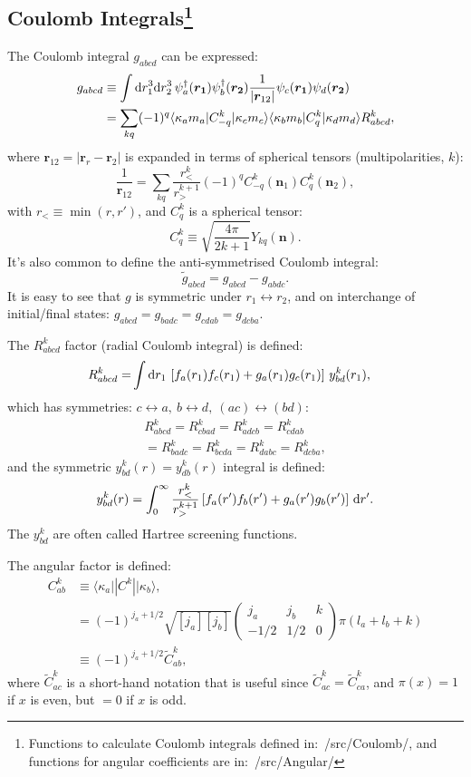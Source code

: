 \documentclass[10pt,twocolumn,a4paper]{article}%
\newcommand{\bra}[1]{\ensuremath{\langle #1|}}	%
\newcommand{\ket}[1]{\ensuremath{|#1\rangle}}	%
\newcommand{\threej}[6]{\ensuremath{\begin{pmatrix}#1&#2&#3\\#4&#5&#6\end{pmatrix}}}	%
\renewcommand{\v}[1]{\ensuremath{\boldsymbol{#1}}}		%
\newcommand{\be}{\begin{equation}}
\newcommand{\ee}{\end{equation}}
\def\d{\ensuremath{{\rm d}}}
\newcommand{\psidag}{\ensuremath{\psi^\dagger}}	%
\renewcommand{\k}{\ensuremath{\kappa}}
\begin{document}
\subsection[Coulomb Integrals]{Coulomb Integrals\label{sec:app-Coulomb}\footnote{Functions to calculate Coulomb integrals defined in:~/src/Coulomb/, and functions for angular coefficients are in:~/src/Angular/}}

The Coulomb integral $g_{abcd}$ can be expressed:
\begin{align}\label{eq:gabcd}
g_{abcd} &\equiv \int\d r_1^3\d r_2^3 \, \psidag_a(\v{r_1})\psidag_b(\v{r_2})\frac{1}{|\v{r}_{12}|}\psi_c(\v{r_1})\psi_d(\v{r_2}) \\
& = \sum_{kq} (-1)^q \bra{\k_a m_a}C^k_{-q}\ket{\k_c m_c} \bra{\k_b m_b}C^k_{q}\ket{\k_d m_d} R^k_{abcd},\notag
\end{align}
where $\v{r}_{12}=|\v{r}_r-\v{r}_2|$ is expanded in terms of spherical tensors (multipolarities, $k$):
\be
\frac{1}{\v{r}_{12}} = \sum_{kq} \frac{r_<^k}{r_>^{k+1}}(-1)^q C^k_{-q}(\v{n}_1)C^k_{q}(\v{n}_2),
\ee
with $r_{<} \equiv \min(r,r')$, and $C^k_{q}$ is a spherical tensor:
\be
C^k_{q} \equiv \sqrt{\frac{4\pi}{2k+1}}Y_{kq}(\v{n}).
\ee
It's also common to define the anti-symmetrised Coulomb integral:
\be
 \widetilde g_{abcd} =  g_{abcd} -  g_{abdc}.
\ee
It is easy to see that $g$ is symmetric under $r_1\leftrightarrow r_2$, and on interchange of initial/final states:
$g_{abcd} = g_{badc} = g_{cdab} = g_{dcba}$.

%
The $R^k_{abcd}$ factor (radial Coulomb integral) is defined:
\begin{align}
R^k_{abcd} =& \int\d r_1 \, \left[f_a(r_1)f_c(r_1) + g_a(r_1)g_c(r_1)\right]\, y^k_{bd}(r_1),
\end{align}
which has symmetries: $c\leftrightarrow a ,~ b\leftrightarrow d  ,~ (ac)\leftrightarrow (bd)$:
\begin{multline}
 R^k_{abcd} =R^k_{cbad} =R^k_{adcb} =R^k_{cdab} \\=R^k_{badc} =R^k_{bcda} =R^k_{dabc} =R^k_{dcba},
\end{multline}
and the symmetric $y^k_{bd}(r) = y^k_{db}(r)$ integral is defined:
\be
y^k_{bd}(r) = \int_0^\infty \frac{r_<^k}{r_>^{k+1}}\left[f_a(r') f_b(r') + g_a(r') g_b(r')\right]\, \d r'.
\ee
The $y^k_{bd}$ are often called Hartree screening functions.

The angular factor is defined:
\begin{align}
C^k_{ab}&\equiv \bra{\k_a}|C^k|\ket{\k_b} ,\\
&= (-1)^{j_a+1/2}\sqrt{[j_a][j_b]}\threej{j_a}{j_b}{k}{-1/2}{1/2}{0}\pi(l_a+l_b+k) \\
&\equiv  (-1)^{j_a+1/2} \widetilde C^k_{ab},
\end{align}
where $\widetilde C^k_{ac}$
 is a short-hand notation that is useful since $\widetilde C^k_{ac} = \widetilde C^k_{ca}$, and $\pi(x)=1$ if $x$ is even, but $=0$ if $x$ is odd.
\end{document}
